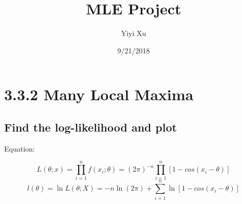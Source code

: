 \documentclass[]{article}
\title{MLE Project}
\author{Yiyi Xu}
\date{9/21/2018}
\begin{document}
\maketitle

\hypertarget{many-local-maxima}{%
\section{3.3.2 Many Local Maxima}\label{many-local-maxima}}

\hypertarget{find-the-log-likelihood-and-plot}{%
\subsection{Find the log-likelihood and
plot}\label{find-the-log-likelihood-and-plot}}

Equation:

\[L(\theta;x)=\prod_{i=1}^{n}f(x_{i};\theta)=(2\pi)^{-n}\prod_{i=1}^{n}[1-cos(x_i-\theta)]\]
\[l(\theta)=\ln L(\theta;X)=-n\ln(2\pi)+\sum_{i=1}^{n}\ln[1-cos(x_i-\theta)]\]
\end{document}
